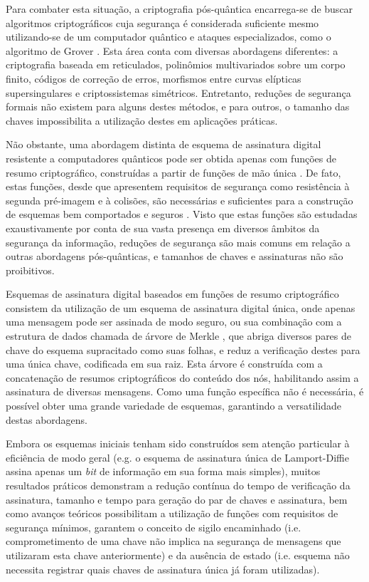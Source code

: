 \documentclass{ufsctex/ufsctex}
\begin{document}
Para combater esta situação, a criptografia pós-quântica encarrega-se de buscar
algoritmos criptográficos cuja segurança é considerada suficiente mesmo
utilizando-se de um computador quântico e ataques especializados, como o
algoritmo de Grover \cite{Grover:1996:FQM:237814.237866}. Esta área conta com
diversas abordagens diferentes: a criptografia baseada em reticulados,
polinômios multivariados sobre um corpo finito, códigos de correção de erros,
morfismos entre curvas elípticas supersingulares e criptossistemas simétricos.
Entretanto, reduções de segurança formais não existem para alguns destes
métodos, e para outros, o tamanho das chaves impossibilita a utilização destes
em aplicações práticas.

Não obstante, uma abordagem distinta de esquema de assinatura digital
resistente a computadores quânticos pode ser obtida apenas com funções de
resumo criptográfico, construídas a partir de funções de mão única
\cite{cryptoeprint:2005:328}. De fato, estas funções, desde que apresentem
requisitos de segurança como resistência à segunda pré-imagem e à colisões, são
necessárias e suficientes para a construção de esquemas bem comportados e
seguros \cite{Rompel:1990:OFN:100216.100269}. Visto que estas funções são
estudadas exaustivamente por conta de sua vasta presença em diversos âmbitos da
segurança da informação, reduções de segurança são mais comuns em relação a
outras abordagens pós-quânticas, e tamanhos de chaves e assinaturas não são
proibitivos.

Esquemas de assinatura digital baseados em funções de resumo criptográfico
consistem da utilização de um esquema de assinatura digital única, onde apenas
uma mensagem pode ser assinada de modo seguro, ou sua combinação com a
estrutura de dados chamada de árvore de Merkle
\cite{Merkle:1989:CDS:118209.118230}, que abriga diversos pares de chave do
esquema supracitado como suas folhas, e reduz a verificação destes para uma
única chave, codificada em sua raiz. Esta árvore é construída com a
concatenação de resumos criptográficos do conteúdo dos nós, habilitando assim a
assinatura de diversas mensagens. Como uma função específica não é necessária,
é possível obter uma grande variedade de esquemas, garantindo a versatilidade
destas abordagens.

Embora os esquemas iniciais tenham sido construídos sem atenção particular à
eficiência de modo geral (e.g. o esquema de assinatura única de Lamport-Diffie
\cite{Lamport1979} assina apenas um \emph{bit} de informação em sua forma mais
simples), muitos resultados práticos demonstram a redução contínua do tempo de
verificação da assinatura, tamanho e tempo para geração do par de chaves e
assinatura, bem como avanços teóricos possibilitam a utilização de funções com
requisitos de segurança mínimos, garantem o conceito de sigilo encaminhado
\cite{Buchmann:2011:XPF:2184003.2184011} (i.e. comprometimento de uma chave não
implica na segurança de mensagens que utilizaram esta chave anteriormente) e da
ausência de estado \cite{Bernstein2015} (i.e. esquema não necessita registrar
quais chaves de assinatura única já foram utilizadas).
\end{document}
